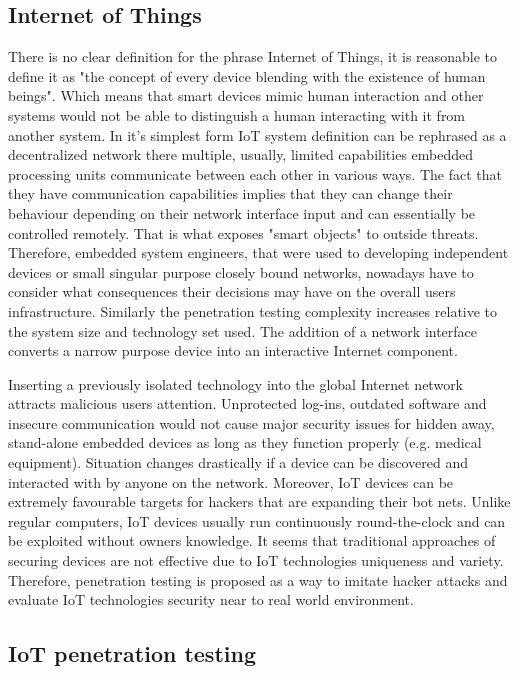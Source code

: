 \subsection{Internet of Things}
There is no clear definition for the phrase Internet of Things, it is reasonable to define it as "the concept of every device blending with the existence of human beings"\cite{DBLP:journals/corr/MendezPY17}. Which means that smart devices mimic human interaction and other systems would not be able to distinguish a human interacting with it from another system. In it's simplest form IoT system definition can be rephrased as a decentralized network there multiple, usually, limited capabilities embedded processing units communicate between each other in various ways\cite{itu-t2060}. The fact that they have communication capabilities implies that they can change their behaviour depending on their network interface input and can essentially be controlled remotely. That is what exposes "smart objects" to outside threats\cite{riahi:hal-00868362}. Therefore, embedded system engineers, that were used to developing independent devices or small singular purpose closely bound networks, nowadays have to consider what consequences their decisions may have on the overall users infrastructure. Similarly the penetration testing complexity increases relative to the system size and technology set used. The addition of a network interface converts a narrow purpose device into an interactive Internet component.

Inserting a previously isolated technology into the global Internet network attracts malicious users attention. Unprotected log-ins, outdated software and insecure communication would not cause major security issues for hidden away, stand-alone embedded devices as long as they function properly (e.g. medical equipment). Situation changes drastically if a device can be discovered and interacted with by anyone on the network. Moreover, IoT devices can be extremely favourable targets for hackers that are expanding their bot nets. Unlike regular computers, IoT devices usually run continuously round-the-clock and can be exploited without owners knowledge\cite{191952}. It seems that traditional approaches of securing devices are not effective\cite{DBLP:journals/corr/abs-1803-05022} due to IoT technologies uniqueness and variety. Therefore, penetration testing is proposed as a way to imitate hacker attacks and evaluate IoT technologies security near to real world environment.

\subsection{IoT penetration testing}

